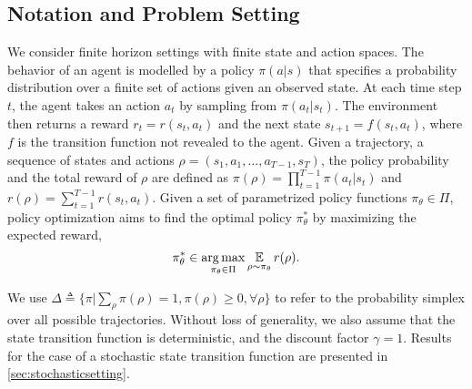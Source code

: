 \subsection{Notation and Problem Setting}
\label{subsec:notations_and_settings}

We consider finite horizon
settings with finite state and action spaces. 
The behavior of an agent is modelled by a policy $\pi(a|s)$
that specifies a probability distribution over a finite set of actions
given an observed state. 
At each time step $t$, the agent takes an action $a_t$ by sampling from
$\pi(a_t | s_t)$.
The environment then returns a reward $r_t = r(s_t, a_t)$ and the next state
$s_{t+1} = f(s_t, a_t)$,
where $f$ is the transition function not revealed to the agent.
Given a trajectory, a sequence of states and actions
$\rho=(s_1, a_1, \dots, a_{T-1}, s_T)$,
the policy probability and the total reward of $\rho$ are defined as
$\pi(\rho) = \prod_{t=1}^{T-1} \pi(a_t| s_t)$
 and $r(\rho) = \sum_{t=1}^{T-1} r(s_t, a_t)$. 
Given a set of parametrized policy functions $\pi_\theta \in \Pi$,
policy optimization aims to find the optimal policy $\pi_\theta^*$
by maximizing the expected reward,
\begin{equation}
\label{max_expected_reward}
\pi_\theta^* \in \argmax_{\pi_\theta \in \Pi}{ \ep\limits_{\rho \sim \pi_\theta}{r(\rho)} }.
\vspace{-0.5cm}
\end{equation}

We use
$\Delta \triangleq \{ \pi | \sum_{\rho}{\pi(\rho)} = 1, \pi(\rho) \ge 0,
\forall \rho \}$
to refer to the probability simplex over all possible trajectories. 
Without loss of generality, we also assume that the state transition function
is deterministic, and the discount factor $\gamma = 1$.
Results for the case of a stochastic state transition function are presented
in \cref{sec:stochasticsetting}.
